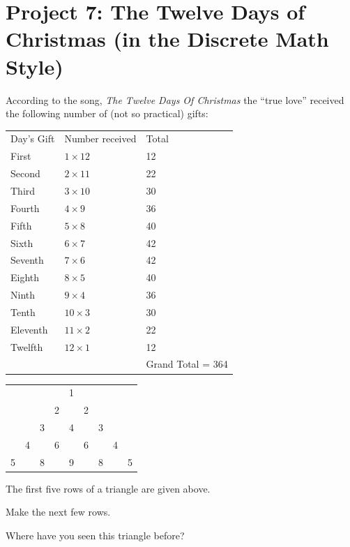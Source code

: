 \documentclass[10pt,]{book}
\theoremstyle{plain}
\theoremstyle{definition}
\theoremstyle{definition}
\theoremstyle{definition}
\theoremstyle{definition}
\numberwithin{equation}{chapter}
\newcommand{\hrulemedium}{\noalign{\hrule height 0.07em}}
\begin{document}
\section[{Project 7: The Twelve Days of Christmas (in the Discrete Math Style)}]{Project 7: The Twelve Days of Christmas (in the Discrete Math Style)}\label{exercises-17}
\hypertarget{p-1340}{}%
According to the song, \emph{The Twelve Days Of Christmas} the ``true love'' received the following number of (not so practical) gifts:%
\begin{sidebyside}{1}{0.2}{0.2}{0}
\begin{sbspanel}{0.6}
{\centering%
\begin{tabular}{lll}
Day's Gift&Number received&Total\tabularnewline\hrulemedium
First&\(1 \times 12\)&12\tabularnewline[0pt]
Second&\(2 \times 11\)&22\tabularnewline[0pt]
Third&\(3 \times 10\)&30\tabularnewline[0pt]
Fourth&\(4 \times 9\)&36\tabularnewline[0pt]
Fifth&\(5 \times 8\)&40\tabularnewline[0pt]
Sixth&\(6 \times 7\)&42\tabularnewline[0pt]
Seventh&\(7 \times 6\)&42\tabularnewline[0pt]
Eighth&\(8 \times 5\)&40\tabularnewline[0pt]
Ninth&\(9 \times 4\)&36\tabularnewline[0pt]
Tenth&\(10 \times 3\)&30\tabularnewline[0pt]
Eleventh&\(11 \times 2\)&22\tabularnewline[0pt]
Twelfth&\(12 \times 1\)&12\tabularnewline[0pt]
&&Grand Total = 364
\end{tabular}
\par}
\end{sbspanel}
\end{sidebyside}
\begin{sidebyside}{1}{0.1}{0.1}{0}
\begin{sbspanel}{0.8}
{\centering%
\begin{tabular}{lllllllll}
&&&&1&&&&\tabularnewline[0pt]
&&&2&&2&&&\tabularnewline[0pt]
&&3&&4&&3&&\tabularnewline[0pt]
&4&&6&&6&&4&\tabularnewline[0pt]
5&&8&&9&&8&&5
\end{tabular}
\par}
\end{sbspanel}
\end{sidebyside}
\par
\hypertarget{p-1341}{}%
The first five rows of a triangle are given above.%
\begin{divisionexercise}{1}\hypertarget{exercise-171}{}
\hypertarget{p-1342}{}%
Make the next few rows.%
\end{divisionexercise}%
\begin{divisionexercise}{2}\hypertarget{exercise-172}{}
\hypertarget{p-1343}{}%
Where have you seen this triangle before?%
\end{divisionexercise}%
\end{document}
